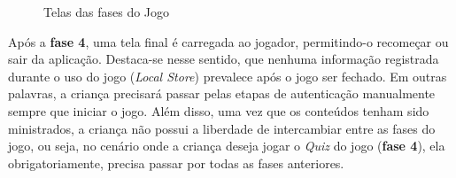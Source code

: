 \documentclass[alpha-refs,brazilian]{RBCA_v2.0}
\begin{document}
 \begin{figure}[h]
  \centering
  \hspace{0.1mm}
  \hfill
  \hspace{0.1mm}
  \caption{Telas das fases do Jogo}
  \label{fig:FasesJogo}
\end{figure}

Após a \textbf{fase 4}, uma tela final é carregada ao jogador, permitindo-o recomeçar ou sair da aplicação. Destaca-se nesse sentido, que nenhuma informação registrada durante o uso do jogo (\textit{Local Store}) prevalece após o jogo ser fechado. Em outras palavras, a criança precisará passar pelas etapas de autenticação manualmente sempre que iniciar o jogo. Além disso, uma vez que os conteúdos tenham sido ministrados, a criança não possui a liberdade de intercambiar entre as fases do jogo, ou seja, no cenário onde a criança deseja jogar o \textit{Quiz} do jogo (\textbf{fase 4}), ela obrigatoriamente, precisa passar por todas as fases anteriores.
\end{document}
